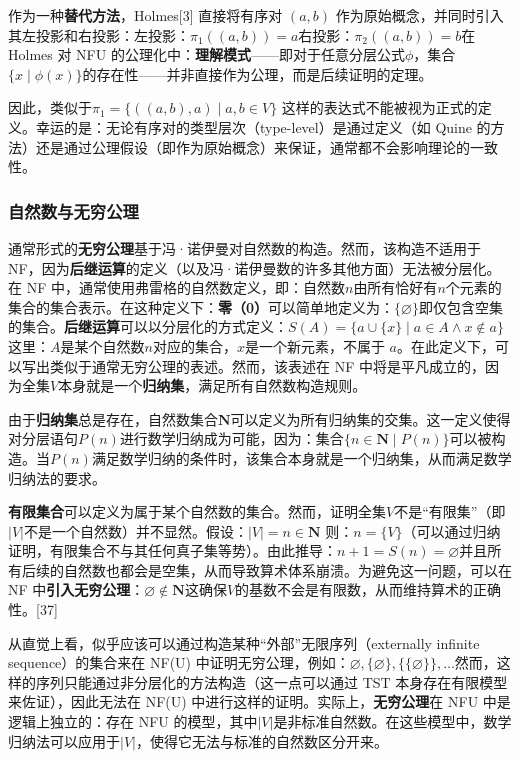 作为一种\textbf{替代方法}，Holmes[3] 直接将有序对 \( (a, b) \) 作为原始概念，并同时引入其左投影和右投影：左投影：\(\pi_1((a, b)) = a\)右投影：\(\pi_2((a, b)) = b\)在Holmes 对 NFU 的公理化中：\textbf{理解模式}——即对于任意分层公式\(\phi\)，集合\(\{x \mid \phi(x)\}\)的存在性——并非直接作为公理，而是后续证明的定理。

因此，类似于\(\pi_1 = \{((a, b), a) \mid a, b \in V\}\)
这样的表达式不能被视为正式的定义。幸运的是：无论有序对的类型层次（type-level）是通过定义（如 Quine 的方法）还是通过公理假设（即作为原始概念）来保证，通常都不会影响理论的一致性。
\subsubsection{自然数与无穷公理} 
通常形式的\textbf{无穷公理}基于冯·诺伊曼对自然数的构造。然而，该构造不适用于 NF，因为\textbf{后继运算}的定义（以及冯·诺伊曼数的许多其他方面）无法被分层化。 在 NF 中，通常使用弗雷格的自然数定义，即：自然数\( n \)由所有恰好有\(n\)个元素的集合的集合表示。在这种定义下：\textbf{零（0）}可以简单地定义为：\(\{\varnothing \}\)即仅包含空集的集合。\textbf{后继运算}可以以分层化的方式定义：\(S(A) = \{ a \cup \{x\} \mid a \in A \land x \notin a \}\)这里：\(A\)是某个自然数\( n\)对应的集合，\(x\)是一个新元素，不属于 \(a\)。在此定义下，可以写出类似于通常无穷公理的表述。然而，该表述在 NF 中将是平凡成立的，因为全集\(V\)本身就是一个\textbf{归纳集}，满足所有自然数构造规则。

由于\textbf{归纳集}总是存在，自然数集合\(\mathbf{N}\)可以定义为所有归纳集的交集。这一定义使得对分层语句\( P(n) \)进行数学归纳成为可能，因为：集合\(\{n \in \mathbf{N} \mid P(n)\}\)可以被构造。当\(P(n)\)满足数学归纳的条件时，该集合本身就是一个归纳集，从而满足数学归纳法的要求。

\textbf{有限集合}可以定义为属于某个自然数的集合。然而，证明全集\(V\)不是“有限集”（即\(|V|\)不是一个自然数）并不显然。假设：\(|V| = n \in \mathbf{N}\)
则：\(n = \{V\}\)（可以通过归纳证明，有限集合不与其任何真子集等势）。由此推导：\(n + 1 = S(n) = \varnothing\)并且所有后续的自然数也都会是空集，从而导致算术体系崩溃。为避免这一问题，可以在 NF 中\textbf{引入无穷公理}：\(\varnothing \notin \mathbf{N}\)这确保\(V\)的基数不会是有限数，从而维持算术的正确性。[37]

从直觉上看，似乎应该可以通过构造某种“外部”无限序列（externally infinite sequence）的集合来在 NF(U) 中证明无穷公理，例如：\(\varnothing, \{\varnothing\}, \{\{\varnothing\}\}, \dots\)然而，这样的序列只能通过非分层化的方法构造（这一点可以通过 TST 本身存在有限模型来佐证），因此无法在 NF(U) 中进行这样的证明。实际上，\textbf{无穷公理}在 NFU 中是逻辑上独立的：存在 NFU 的模型，其中\( |V| \)是非标准自然数。在这些模型中，数学归纳法可以应用于\( |V| \)，使得它无法与标准的自然数区分开来。


